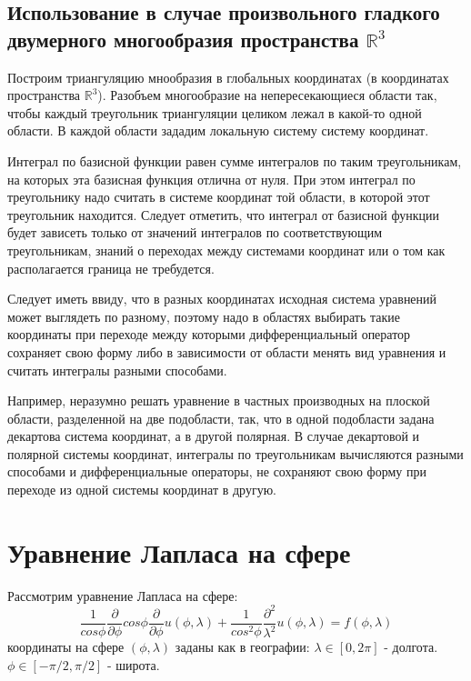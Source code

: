 \documentclass[a4paper]{article}
\begin{document}
\subsection*{Использование в случае произвольного гладкого
 двумерного многообразия пространства ${\mathbb R}^{3}$}

Построим триангуляцию мнообразия в глобальных координатах (в
координатах пространства ${\mathbb R}^{3}$). Разобъем многообразие на
непересекающиеся области так, чтобы каждый треугольник триангуляции
целиком лежал в какой-то одной области. В каждой области зададим
локальную систему систему координат. 

Интеграл по базисной функции равен сумме интегралов по таким
треугольникам, на которых эта базисная функция отлична от нуля. При
этом интеграл по треугольнику надо считать в системе координат той
области, в которой этот треугольник находится. Следует отметить, что
интеграл от базисной функции будет зависеть только от значений
интегралов по соответствующим треугольникам, знаний о переходах между
системами координат или о том как располагается граница не
требудется. 

Следует иметь ввиду, что в разных координатах исходная система
уравнений может выглядеть по разному, поэтому надо в областях
выбирать такие координаты при переходе между которыми дифференциальный
оператор сохраняет свою форму либо в зависимости от области менять вид
уравнения и считать интегралы разными способами.

Например, неразумно решать уравнение в частных производных на плоской
области, разделенной на две подобласти, так, что в одной подобласти
задана декартова система координат, а в другой полярная. В случае
декартовой и полярной системы координат, интегралы по треугольникам
вычисляются разными способами и дифференциальные
операторы, не сохраняют свою форму при переходе из одной системы
координат в другую.

\section*{Уравнение Лапласа на сфере}
Рассмотрим уравнение Лапласа на сфере:
\begin{equation*}
\frac{1}{cos\phi}\frac{\partial}{\partial\phi}
cos\phi\frac{\partial}{\partial\phi} u(\phi, \lambda) +
\frac{1}{cos^2\phi}\frac{\partial^2}
{\lambda^2} u(\phi, \lambda) = f(\phi, \lambda)
\end{equation*}
координаты на сфере $(\phi,\lambda)$ заданы как в географии:
$\lambda \in [0,2\pi]$ - долгота. $\phi \in [-\pi/2,\pi/2]$ - широта.
\end{document}
